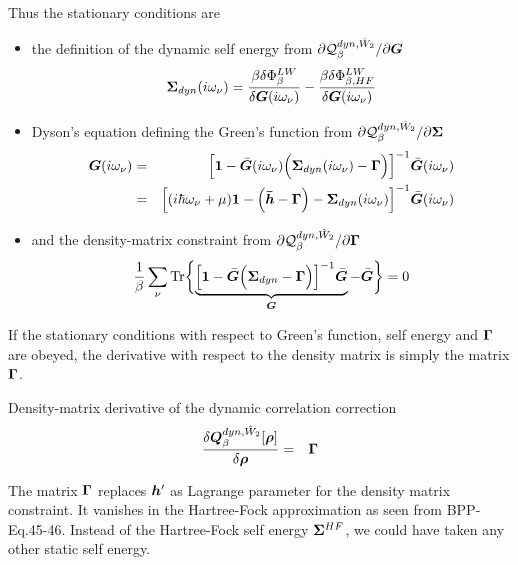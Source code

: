 \documentclass[11pt,a4paper]{report}
\begin{document}
Thus the stationary conditions are
\begin{itemize}
\item the definition of the dynamic self energy 
from $\partial\mathcal{Q}_{\beta}^{dyn,\hat{W}_2}/\partial\bm{G}$
\begin{eqnarray}
\bm{\Sigma}_{dyn}(i\omega_\nu)
=\frac{\beta\delta\Phi^{LW}_\beta}{\delta\bm{G}(i\omega_\nu)}
-\frac{\beta\delta\Phi^{LW}_{\beta,HF}}{\delta\bm{G}(i\omega_\nu)}
\end{eqnarray}
%
\item Dyson's equation defining the Green's function
from $\partial\mathcal{Q}_{\beta}^{dyn,\hat{W}_2}/\partial\bm{\Sigma}$
\begin{eqnarray}
\bm{G}(i\omega_\nu)&=&\Bigl[\bm{1}-\bar{\bm{G}}(i\omega_\nu)
\Bigl(\bm{\Sigma}_{dyn}(i\omega_\nu)-\bm{\Gamma}\Bigr)\Bigr]^{-1}
\bar{\bm{G}}(i\omega_\nu)
\nonumber\\
&=&\Bigl[(i\hbar\omega_\nu+\mu)\bm{1}-\Bigl(\bm{\bar{h}}-\bm{\Gamma}\Bigr)
-\bm{\Sigma}_{dyn}(i\omega_\nu)\Bigr]^{-1}
\bar{\bm{G}}(i\omega_\nu)
\end{eqnarray}
%
\item and the density-matrix constraint
from $\partial\mathcal{Q}_{\beta}^{dyn,\hat{W}_2}/\partial\bm{\Gamma}$
\begin{eqnarray}
\frac{1}{\beta}\sum_\nu\mathrm{Tr}\biggl\lbrace
\underbrace{\Bigl[\bm{1}-\bar{\bm{G}}
\Bigl(\bm{\Sigma}_{dyn}-\bm{\Gamma}\Bigr)\Bigr]^{-1}
\bar{\bm{G}}}_{\bm{G}}
-\bar{\bm{G}}
\biggr\rbrace=0
\end{eqnarray}
\end{itemize}
If the stationary conditions with respect to Green's function, self
energy and $\bm{\Gamma}$ are obeyed, the derivative with respect to
the density matrix is simply the matrix $\bm{\Gamma}$.
\begin{myshadowminipage}{Density-matrix derivative of the 
dynamic correlation correction}
\begin{eqnarray}
\frac{\delta\bm{Q}^{dyn,\hat{W}_2}_\beta[\bm{\rho}]}{\delta\bm{\rho}}
&=&\bm{\Gamma}
\end{eqnarray}
\end{myshadowminipage}

The matrix $\bm{\Gamma}$ replaces $\bm{h}'$ as Lagrange parameter
for the density matrix constraint.  It vanishes in the Hartree-Fock
approximation as seen from
BPP-Eq.45-46\cite{bloechl13_prb88_25139}. Instead of the Hartree-Fock
self energy $\bm{\Sigma}^{HF}$, we could have taken any other static
self energy.
\end{document}
